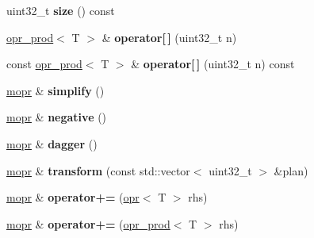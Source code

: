 \begin{DoxyCompactItemize}
\item 
\mbox{\label{classqbasis_1_1mopr_af01538342c9ddaf307a008f5ec427173}} 
uint32\+\_\+t {\bfseries size} () const
\item 
\mbox{\label{classqbasis_1_1mopr_ac47b0e2715c11c52c20b5c5ecdda592e}} 
\hyperlink{classqbasis_1_1opr__prod}{opr\+\_\+prod}$<$ T $>$ \& {\bfseries operator\mbox{[}$\,$\mbox{]}} (uint32\+\_\+t n)
\item 
\mbox{\label{classqbasis_1_1mopr_ad2672c65b606fca08646bf3de1cc8b8c}} 
const \hyperlink{classqbasis_1_1opr__prod}{opr\+\_\+prod}$<$ T $>$ \& {\bfseries operator\mbox{[}$\,$\mbox{]}} (uint32\+\_\+t n) const
\item 
\mbox{\label{classqbasis_1_1mopr_a4626b29d5de74e5173f4c7bf6b15e509}} 
\hyperlink{classqbasis_1_1mopr}{mopr} \& {\bfseries simplify} ()
\item 
\mbox{\label{classqbasis_1_1mopr_a467cae826cd3e05bcbb6a6db7c075027}} 
\hyperlink{classqbasis_1_1mopr}{mopr} \& {\bfseries negative} ()
\item 
\mbox{\label{classqbasis_1_1mopr_ac3aa2f16aff614de809dae0cdb10b19e}} 
\hyperlink{classqbasis_1_1mopr}{mopr} \& {\bfseries dagger} ()
\item 
\mbox{\label{classqbasis_1_1mopr_a550b1bae7fbaf5b0eda4f603c3552690}} 
\hyperlink{classqbasis_1_1mopr}{mopr} \& {\bfseries transform} (const std\+::vector$<$ uint32\+\_\+t $>$ \&plan)
\item 
\mbox{\label{classqbasis_1_1mopr_aba96f7baac48bff253924cc753c348f3}} 
\hyperlink{classqbasis_1_1mopr}{mopr} \& {\bfseries operator+=} (\hyperlink{classqbasis_1_1opr}{opr}$<$ T $>$ rhs)
\item 
\mbox{\label{classqbasis_1_1mopr_a62ae8488c710996d47c0e8a88b3a53e3}} 
\hyperlink{classqbasis_1_1mopr}{mopr} \& {\bfseries operator+=} (\hyperlink{classqbasis_1_1opr__prod}{opr\+\_\+prod}$<$ T $>$ rhs)
\item 
\mbox{\label{classqbasis_1_1mopr_aea038add23d6dab39f7974c33b196f92}} 

\end{DoxyCompactItemize}
